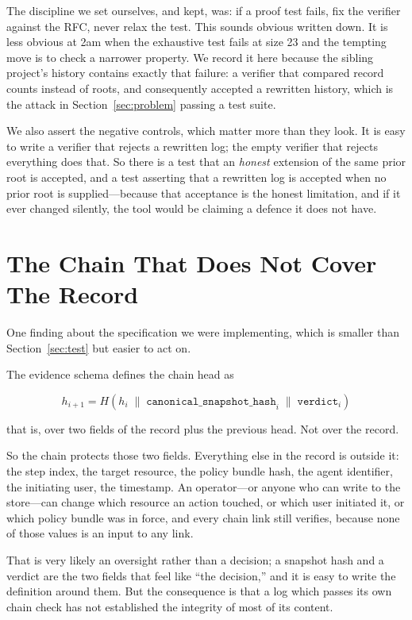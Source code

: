 \documentclass[11pt]{article}
\begin{document}
The discipline we set ourselves, and kept, was: if a proof test fails, fix the
verifier against the RFC, never relax the test. This sounds obvious written
down. It is less obvious at 2am when the exhaustive test fails at size 23 and
the tempting move is to check a narrower property. We record it here because
the sibling project's history contains exactly that failure: a verifier that
compared record counts instead of roots, and consequently accepted a rewritten
history, which is the attack in Section~\ref{sec:problem} passing a test suite.

We also assert the negative controls, which matter more than they look. It is
easy to write a verifier that rejects a rewritten log; the empty verifier that
rejects everything does that. So there is a test that an \emph{honest}
extension of the same prior root is accepted, and a test asserting that a
rewritten log is accepted when no prior root is supplied---because that
acceptance is the honest limitation, and if it ever changed silently, the tool
would be claiming a defence it does not have.

\section{The Chain That Does Not Cover The Record}
\label{sec:gap}

One finding about the specification we were implementing, which is smaller
than Section~\ref{sec:test} but easier to act on.

The evidence schema defines the chain head as

\[
h_{i+1} = H(h_i \; \| \; \texttt{canonical\_snapshot\_hash}_i \; \| \; \texttt{verdict}_i)
\]

that is, over two fields of the record plus the previous head. Not over the
record.

So the chain protects those two fields. Everything else in the record is
outside it: the step index, the target resource, the policy bundle hash, the
agent identifier, the initiating user, the timestamp. An operator---or anyone
who can write to the store---can change which resource an action touched, or
which user initiated it, or which policy bundle was in force, and every chain
link still verifies, because none of those values is an input to any link.

That is very likely an oversight rather than a decision; a snapshot hash and a
verdict are the two fields that feel like ``the decision,'' and it is easy to
write the definition around them. But the consequence is that a log which
passes its own chain check has not established the integrity of most of its
content.
\end{document}
